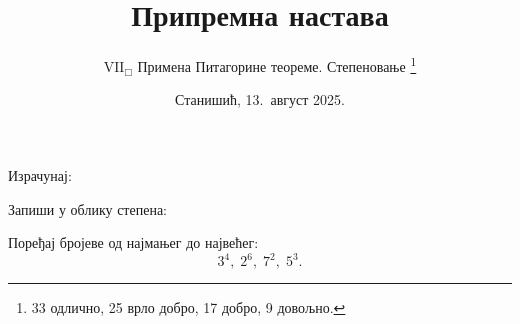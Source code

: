 \documentclass[11pt,a5paper,twoside,addpoints,noanswers]{exam} %
\title{Припремна настава}
\author{$\mathrm{VII}_\Box$ Примена Питагорине теореме. Степеновање
 \thanks{
  33 одлично,
  25 врло добро,
  17 добро,
   9 довољно.
 }
}
\date{Станишић, 13.\ август 2025.}
\newcommand{\variant}[4]{#1}
\begin{document}
\maketitle
\thispagestyle{headandfoot}

\ifprintanswers\else
\begin{flushleft}
\gradetable[v]\newpage
\end{flushleft}
\fi

\begin{questions}

\question %
Израчунај:
\begin{multicols}{3}
\end{multicols}

\question %
Запиши у облику степена:

\question[3] %
Поређај бројеве од најмањег до највећег:
\[
\variant
 {3^4,\; 2^6,\; 7^2,\; 5^3}
 {2^8,\; 10^2,\; 3^5,\; 9^2}
 {11^2,\; 2^7,\; 4^4,\; 6^3}
 {2^9,\; 3^6,\; 5^4,\; 7^3}.
\]


\end{questions}
\end{document}
